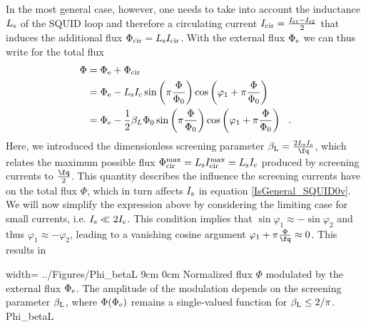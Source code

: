 In the most general case, however, one needs to take into account the inductance $L_{\rm s}$ of the SQUID loop and therefore a circulating current $I_{\rm cir} = \frac{I_{\rm s1} - I_{\rm s2}}{2}$ that induces the additional flux $\Phi_{\rm cir} = L_{\rm s}I_{\rm cir}$. With the external flux $\Phi_{\rm e}$ we can thus write for the total flux
\begin{align}
	\Phi &= \Phi_{\rm e} + \Phi_{\rm cir} \\ &= \Phi_{\rm e} - L_{\rm s} I_{\rm  c} \sin \left(\pi \frac{\Phi}{\Phi_0}\right) \cos \left(\varphi_1+\pi \frac{\Phi}{\Phi_0}\right) \\ &= \Phi_{\mathrm{e}}-\frac{1}{2} \beta_L \Phi_0 \sin \left(\pi \frac{\Phi}{\Phi_0}\right) \cos \left(\varphi_1+\pi \frac{\Phi}{\Phi_0}\right) \ \ .
\end{align}
Here, we introduced the dimensionless screening parameter $\beta_{\rm L}=\frac{2L_{\rm s}I_{\rm c}}{\unit{\fq}}$, which relates the maximum possible flux $\Phi_{\rm cir}^{\rm max} = L_{\rm s}I_{\rm cir}^{\rm max} = L_{\rm s}I_{\rm c}$ produced by screening currents to $\frac{\unit{\fq}}{2}$. This quantity describes the influence the screening currents have on the total flux $\Phi$, which in turn affects $I_{\rm s}$ in equation \ref{IsGeneral_SQUID0v}. We will now simplify the expression above by considering the limiting case for small currents, i.e. $I_{\rm s}\ll 2I_{\rm c}$. This condition implies that $\sin\varphi_1\approx -  \sin\varphi_2$ and thus $\varphi_1\approx - \varphi_2$, leading to a vanishing cosine argument $\varphi_1 + \pi\frac{\Phi}{\unit{\fq}} \approx 0$. This results in



{width=\textwidth}
{../Figures/Phi_betaL}
{9cm}
{0cm}
{Normalized flux $\Phi$ modulated by the external flux $\Phi_{\rm e}$. The amplitude of the modulation depends on the screening parameter $\beta_{\rm L}$, where $\Phi(\Phi_{\rm e})$ remains a single-valued function for $\beta_{\rm L}\leq2/\pi$.} 
{Phi_betaL}

